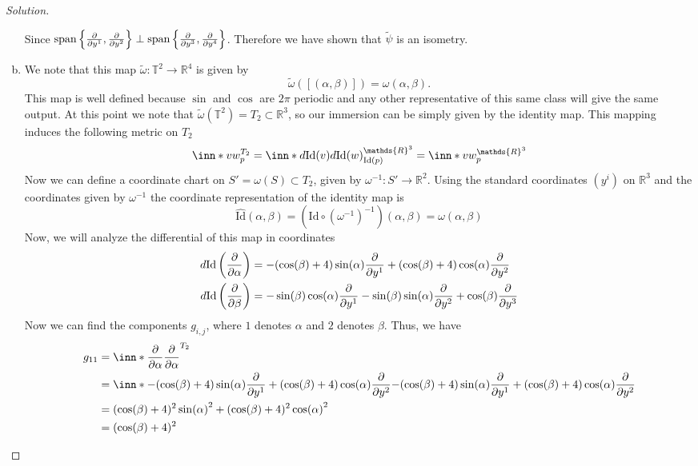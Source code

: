 \documentclass[a4paper]{article}
\begin{document}
\begin{proof}[Solution]
\begin{enumerate}[(a)]
\[      \]
      Since $ \text{span}\left\{ \pdv{y^1}, \pdv{y^2} \right\} \perp \text{span} \left\{ \pdv{y^3}, \pdv{y^4} \right\}$. Therefore we have shown that $\tilde{\psi}$ is an isometry.
    \item We note that this map $\tilde{\omega}: \mathds{T}^2 \rightarrow \mathds{R}^4$ is given by
      \[
        \tilde{\omega} \left( [(\alpha, \beta)] \right) =  \omega(\alpha, \beta).
      \]
      This map is well defined because $\sin$ and $\cos$ are $2\pi$ periodic and any other representative of this same class will give the same output. At this point we note that $\tilde{\omega}(\mathds{T}^2) = T_2 \subset \mathds{R}^3$, so our immersion can be simply given by the identity map. This mapping induces the following metric on $T_2$
      \[
        \inn*{v}{w}_p^{T_2} = \inn*{d \text{Id}(v)}{d \text{Id}(w)}_{\text{Id}(p)}^{\mathds{R}^3} = \inn*{v}{w}_p^{\mathds{R}^3}
      \]
      Now we can define a coordinate chart on $S' = \omega(S) \subset T_2$, given by $\omega^{-1}: S' \rightarrow \mathds{R}^2$. Using the standard coordinates $(y^i)$ on $\mathds{R}^3$ and the coordinates given by $\omega^{-1}$ the coordinate representation of the identity map is
      \[
        \hat{\text{Id}}(\alpha, \beta) = (\text{Id} \circ (\omega^{-1})^{-1})(\alpha,\beta) = \omega(\alpha,\beta)
      \]
      Now, we will analyze the differential of this map in coordinates
      \[
        \begin{aligned}
          d \text{Id} \left( \pdv{\alpha} \right) &= -(\cos(\beta) + 4)\sin(\alpha)\pdv{y^1} + (\cos(\beta) + 4)\cos(\alpha) \pdv{y^2} \\
          d \text{Id} \left( \pdv{\beta} \right)                  &= -\sin(\beta)\cos(\alpha)\pdv{y^1} - \sin(\beta)\sin(\alpha) \pdv{y^2} + \cos(\beta) \pdv{y^3}
        \end{aligned}
      \]
      Now we can find the components $g_{i,j}$, where $1$ denotes $\alpha$ and $2$ denotes $\beta$. Thus, we have
      \[
        \begin{aligned}
          g_{11} &= \inn*{\pdv{\alpha}}{\pdv{\alpha}}^{T_2} \\
                 &= \inn*{-(\cos(\beta) + 4)\sin(\alpha)\pdv{y^1} + (\cos(\beta) + 4)\cos(\alpha) \pdv{y^2}}{ -(\cos(\beta) + 4)\sin(\alpha)\pdv{y^1} + (\cos(\beta) + 4)\cos(\alpha) \pdv{y^2}} \\
                 &= (\cos(\beta) + 4)^2\sin(\alpha)^2  + (\cos(\beta) + 4)^2\cos(\alpha)^2 \\
                 &= (\cos(\beta) + 4)^2
        \end{aligned}
\]
\end{enumerate}
\end{proof}
\end{document}

